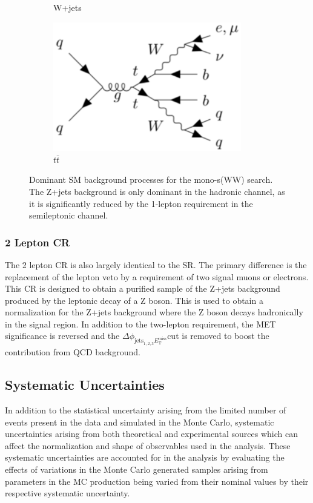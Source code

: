 \documentclass[12pt]{article}
\newcommand*{\met}{\ensuremath{E_\text{T}^\text{miss}}}
\newcommand*{\mindphi}{\ensuremath{\Delta \phi_{\text{jets}_{1,2,3} \met}}}
\begin{document}
\begin{figure}[H]
\begin{subfigure}[b]{0.4\textwidth}
         \caption[]{W+jets}
         \label{fig:wjets}
     \end{subfigure}
     \hfill
     \begin{subfigure}[b]{0.4\textwidth}
         \centering
         \includegraphics[width=0.9\textwidth]{figures/ttbar_feynman.png}
         \caption[]{$t\bar{t}$}
         \label{fig:ttbar}
     \end{subfigure}
\caption[]{Dominant SM background processes for the mono-s(WW) search. The Z+jets background is only dominant in the hadronic channel, as it is significantly reduced by the 1-lepton requirement in the semileptonic channel.}
\label{fig:dom_bkgs}
\end{figure}
\subsubsection{2 Lepton CR}

The 2 lepton CR is also largely identical to the SR. The primary difference is the replacement of the lepton veto by a requirement of two signal muons or electrons. This CR is designed to obtain a purified sample of the Z+jets background produced by the leptonic decay of a Z boson. This is used to obtain a normalization for the Z+jets background where the Z boson decays hadronically in the signal region. In addition to the two-lepton requirement, the MET significance is reversed and the \mindphi cut is removed to boost the contribution from QCD background. 

\subsection{Systematic Uncertainties}

In addition to the statistical uncertainty arising from the limited number of events present in the data and simulated in the Monte Carlo, systematic uncertainties arising from both theoretical and experimental sources which can affect the normalization and shape of observables used in the analysis. These systematic uncertainties are accounted for in the analysis by evaluating the effects of variations in the Monte Carlo generated samples arising from parameters in the MC production being varied from their nominal values by their respective systematic uncertainty. 
\end{document}
